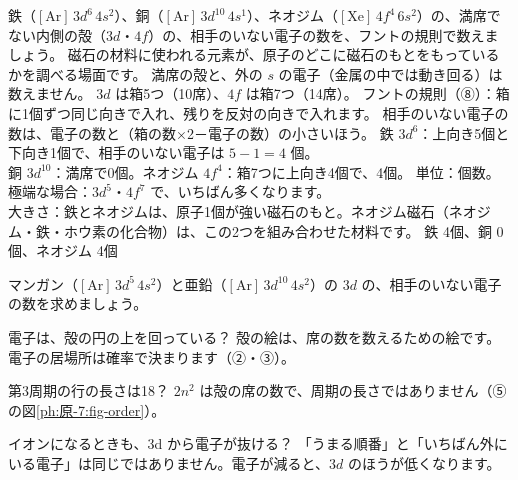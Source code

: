 \label{ph:原-7:ex12}
\begin{phreidai}[原子の小さな磁石を数える]
鉄（$[\mathrm{Ar}]\,3d^6\,4s^2$）、銅（$[\mathrm{Ar}]\,3d^{10}\,4s^1$）、ネオジム（$[\mathrm{Xe}]\,4f^4\,6s^2$）の、満席でない内側の殻（$3d$・$4f$）の、相手のいない電子の数を、フントの規則で数えましょう。
\phbamen
磁石の材料に使われる元素が、原子のどこに磁石のもとをもっているかを調べる場面です。
\phmushi
満席の殻と、外の $s$ の電子（金属の中では動き回る）は数えません。
\phzu
$3d$ は箱5つ（10席）、$4f$ は箱7つ（14席）。
\phriyu
フントの規則（⑧）：箱に1個ずつ同じ向きで入れ、残りを反対の向きで入れます。
\phtateru
相手のいない電子の数は、電子の数と（箱の数×2－電子の数）の小さいほう。
\phtoku
鉄 $3d^6$：上向き5個と下向き1個で、相手のいない電子は $5-1=4$ 個。\\
銅 $3d^{10}$：満席で0個。ネオジム $4f^4$：箱7つに上向き4個で、4個。
\phtashikame
単位：個数。極端な場合：$3d^5$・$4f^7$ で、いちばん多くなります。\\
大きさ：鉄とネオジムは、原子1個が強い磁石のもと。ネオジム磁石（ネオジム・鉄・ホウ素の化合物）は、この2つを組み合わせた材料です。
\kotae 鉄 4個、銅 0個、ネオジム 4個
\end{phreidai}
\begin{jibun}
マンガン（$[\mathrm{Ar}]\,3d^5\,4s^2$）と亜鉛（$[\mathrm{Ar}]\,3d^{10}\,4s^2$）の $3d$ の、相手のいない電子の数を求めましょう。
\end{jibun}

\begin{tsumazuki}{電子は、殻の円の上を回っている？}
殻の絵は、席の数を数えるための絵です。電子の居場所は確率で決まります（②・③）。
\end{tsumazuki}

\begin{tsumazuki}{第3周期の行の長さは18？}
$2n^2$ は殻の席の数で、周期の長さではありません（⑤の図\ref{ph:原-7:fig-order}）。
\end{tsumazuki}

\begin{tsumazuki}{イオンになるときも、3d から電子が抜ける？}
「うまる順番」と「いちばん外にいる電子」は同じではありません。電子が減ると、$3d$ のほうが低くなります。
\end{tsumazuki}

